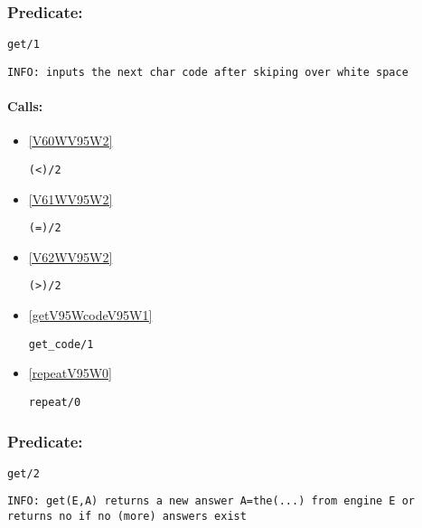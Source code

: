 \subsubsection{Predicate:} \label{getV95W1}

\begin{verbatim}
get/1
\end{verbatim}

{\small \begin{verbatim}
INFO: inputs the next char code after skiping over white space

\end{verbatim}}
\paragraph{Calls:} 
\begin{itemize}
\item \ref{V60WV95W2} 
\begin{verbatim}
(<)/2
\end{verbatim}

\item \ref{V61WV95W2} 
\begin{verbatim}
(=)/2
\end{verbatim}

\item \ref{V62WV95W2} 
\begin{verbatim}
(>)/2
\end{verbatim}

\item \ref{getV95WcodeV95W1} 
\begin{verbatim}
get_code/1
\end{verbatim}

\item \ref{repeatV95W0} 
\begin{verbatim}
repeat/0
\end{verbatim}

\end{itemize}

\subsubsection{Predicate:} \label{getV95W2}

\begin{verbatim}
get/2
\end{verbatim}

{\small \begin{verbatim}
INFO: get(E,A) returns a new answer A=the(...) from engine E or returns no if no (more) answers exist

\end{verbatim}}
